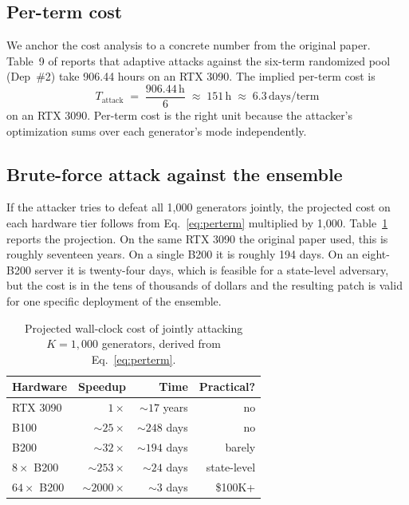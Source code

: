 \documentclass[conference]{IEEEtran}
\begin{document}
\subsection{Per-term cost}

We anchor the cost analysis to a concrete number from the original
paper. Table~9 of \cite{feng2025fff} reports that adaptive attacks
against the six-term randomized pool (Dep~\#2) take 906.44 hours on an
RTX 3090. The implied per-term cost is
\begin{equation}
    T_{\text{attack}}
    \;=\; \frac{906.44\,\text{h}}{6}
    \;\approx\; 151\,\text{h}
    \;\approx\; 6.3\,\text{days/term}
    \label{eq:perterm}
\end{equation}
on an RTX 3090. Per-term cost is the right unit because the attacker's
optimization sums over each generator's mode independently.

\subsection{Brute-force attack against the ensemble}

If the attacker tries to defeat all 1{,}000 generators jointly, the
projected cost on each hardware tier follows from
Eq.~\eqref{eq:perterm} multiplied by 1{,}000.
Table~\ref{tab:bruteforce} reports the projection. On the same RTX 3090
the original paper used, this is roughly seventeen years. On a single
B200 it is roughly 194 days. On an eight-B200 server it is twenty-four
days, which is feasible for a state-level adversary, but the cost is
in the tens of thousands of dollars and the resulting patch is valid
for one specific deployment of the ensemble.

\begin{table}[!t]
\caption{Projected wall-clock cost of jointly attacking
$K{=}1{,}000$ generators, derived from Eq.~\eqref{eq:perterm}.}
\label{tab:bruteforce}
\centering
\renewcommand{\arraystretch}{1.15}
\begin{tabular}{lrrr}
\toprule
\textbf{Hardware} & \textbf{Speedup} & \textbf{Time} &
\textbf{Practical?} \\
\midrule
RTX 3090       & $1\times$         & ${\sim}17$ years   & no \\
B100           & ${\sim}25\times$  & ${\sim}248$ days   & no \\
B200           & ${\sim}32\times$  & ${\sim}194$ days   & barely \\
$8\times$ B200 & ${\sim}253\times$ & ${\sim}24$ days    & state-level \\
$64\times$ B200& ${\sim}2000\times$& ${\sim}3$ days     & \$100K+ \\
\bottomrule
\end{tabular}
\end{table}
\end{document}
